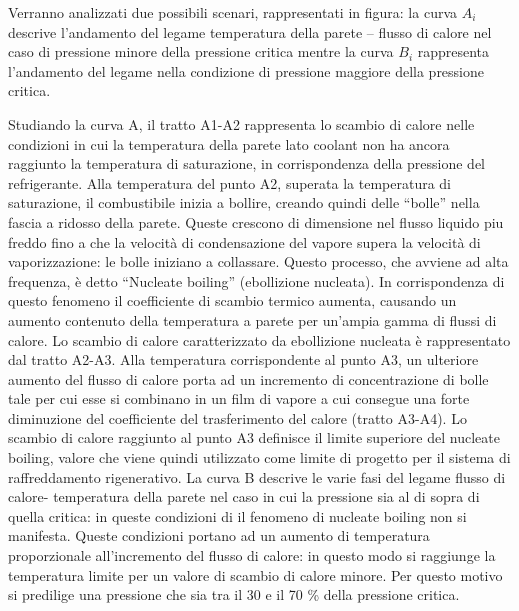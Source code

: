  
Verranno analizzati due possibili scenari, rappresentati in figura: la curva $A_i$ descrive l'andamento del legame temperatura della parete – flusso di calore nel caso di pressione minore della pressione critica mentre la curva $B_i$ rappresenta l'andamento del legame nella condizione di pressione maggiore della pressione critica.

Studiando la curva A, il tratto A1-A2 rappresenta lo scambio di calore nelle condizioni in cui la temperatura della parete lato coolant non ha ancora raggiunto la temperatura di saturazione, in corrispondenza della pressione del refrigerante. Alla temperatura del punto A2, superata la temperatura di saturazione, il combustibile inizia a bollire, creando quindi delle “bolle” nella fascia a ridosso della parete. Queste crescono di dimensione nel flusso liquido piu freddo fino a che la velocità di condensazione del vapore supera la velocità di vaporizzazione: le bolle iniziano a collassare. Questo processo, che avviene ad alta frequenza, è detto “Nucleate boiling” (ebollizione nucleata). In corrispondenza di questo fenomeno il coefficiente di scambio termico aumenta, causando un aumento contenuto della temperatura a parete per un'ampia gamma di flussi di calore. Lo scambio di calore caratterizzato da ebollizione nucleata è rappresentato dal tratto A2-A3. Alla temperatura corrispondente al punto A3, un ulteriore aumento del flusso di calore porta ad un incremento di concentrazione di bolle tale per cui esse si combinano in un film di vapore a cui consegue una forte diminuzione del coefficiente del trasferimento del calore (tratto A3-A4). Lo scambio di calore raggiunto al punto A3 definisce il limite superiore del nucleate boiling, valore che viene quindi utilizzato come limite di progetto per il sistema di raffreddamento rigenerativo.
La curva B descrive le varie fasi del legame flusso di calore- temperatura della parete nel caso in cui la pressione sia al di sopra di quella critica: in queste condizioni di il fenomeno di nucleate boiling non si manifesta. Queste condizioni portano ad un aumento di temperatura proporzionale all'incremento del flusso di calore: in questo modo si raggiunge la temperatura limite per un valore di scambio di calore minore. Per questo motivo si predilige una pressione che sia tra il 30 e il 70 \% della pressione critica.
